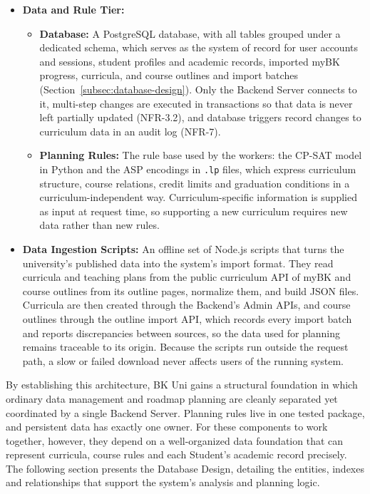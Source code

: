 \begin{itemize}
    \item \textbf{Data and Rule Tier:}
    \begin{itemize}
        \item \textbf{Database:} A PostgreSQL database, with all tables grouped under a dedicated schema, which serves as the system of record for user accounts and sessions, student profiles and academic records, imported myBK progress, curricula, and course outlines and import batches (Section~\ref{subsec:database-design}). Only the Backend Server connects to it, multi-step changes are executed in transactions so that data is never left partially updated (NFR-3.2), and database triggers record changes to curriculum data in an audit log (NFR-7).
        \item \textbf{Planning Rules:} The rule base used by the workers: the CP-SAT model in Python and the ASP encodings in \texttt{.lp} files, which express curriculum structure, course relations, credit limits and graduation conditions in a curriculum-independent way. Curriculum-specific information is supplied as input at request time, so supporting a new curriculum requires new data rather than new rules.
    \end{itemize}

    \item \textbf{Data Ingestion Scripts:} An offline set of Node.js scripts that turns the university's published data into the system's import format. They read curricula and teaching plans from the public curriculum API of myBK and course outlines from its outline pages, normalize them, and build JSON files. Curricula are then created through the Backend's Admin APIs, and course outlines through the outline import API, which records every import batch and reports discrepancies between sources, so the data used for planning remains traceable to its origin. Because the scripts run outside the request path, a slow or failed download never affects users of the running system.

\end{itemize}

By establishing this architecture, BK Uni gains a structural foundation in which ordinary data management and roadmap planning are cleanly separated yet coordinated by a single Backend Server. Planning rules live in one tested package, and persistent data has exactly one owner. For these components to work together, however, they depend on a well-organized data foundation that can represent curricula, course rules and each Student's academic record precisely. The following section presents the Database Design, detailing the entities, indexes and relationships that support the system's analysis and planning logic.

